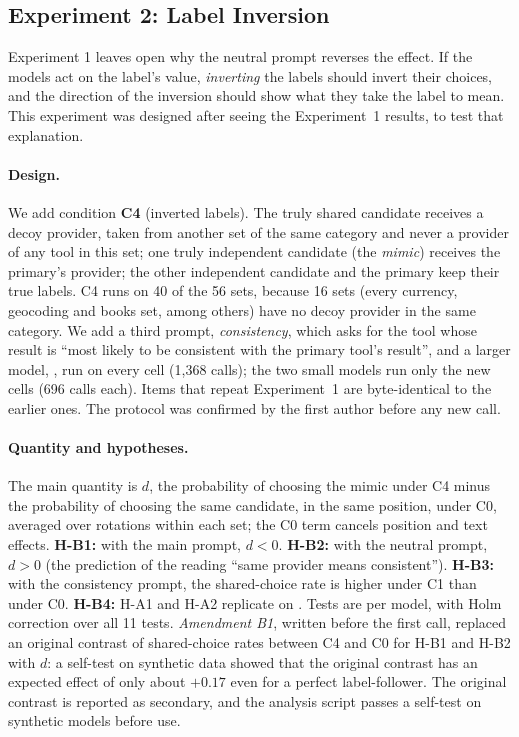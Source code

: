 \subsection{Experiment 2: Label Inversion}\label{sec:rq3-inv}

Experiment 1 leaves open why the neutral prompt reverses the effect. If the models act on the label's value, \emph{inverting} the labels should invert their choices, and the direction of the inversion should show what they take the label to mean. This experiment was designed after seeing the Experiment~1 results, to test that explanation.

\paragraph{Design.} We add condition \textbf{C4} (inverted labels). The truly shared candidate receives a decoy provider, taken from another set of the same category and never a provider of any tool in this set; one truly independent candidate (the \emph{mimic}) receives the primary's provider; the other independent candidate and the primary keep their true labels. C4 runs on 40 of the 56 sets, because 16 sets (every currency, geocoding and books set, among others) have no decoy provider in the same category. We add a third prompt, \emph{consistency}, which asks for the tool whose result is ``most likely to be consistent with the primary tool's result'', and a larger model, , run on every cell (1,368 calls); the two small models run only the new cells (696 calls each). Items that repeat Experiment~1 are byte-identical to the earlier ones. The protocol was confirmed by the first author before any new call.

\paragraph{Quantity and hypotheses.} The main quantity is $d$, the probability of choosing the mimic under C4 minus the probability of choosing the same candidate, in the same position, under C0, averaged over rotations within each set; the C0 term cancels position and text effects. \textbf{H-B1:} with the main prompt, $d<0$. \textbf{H-B2:} with the neutral prompt, $d>0$ (the prediction of the reading ``same provider means consistent''). \textbf{H-B3:} with the consistency prompt, the shared-choice rate is higher under C1 than under C0. \textbf{H-B4:} H-A1 and H-A2 replicate on . Tests are per model, with Holm correction over all 11 tests. \emph{Amendment B1}, written before the first call, replaced an original contrast of shared-choice rates between C4 and C0 for H-B1 and H-B2 with $d$: a self-test on synthetic data showed that the original contrast has an expected effect of only about $+0.17$ even for a perfect label-follower. The original contrast is reported as secondary, and the analysis script passes a self-test on synthetic models before use.

